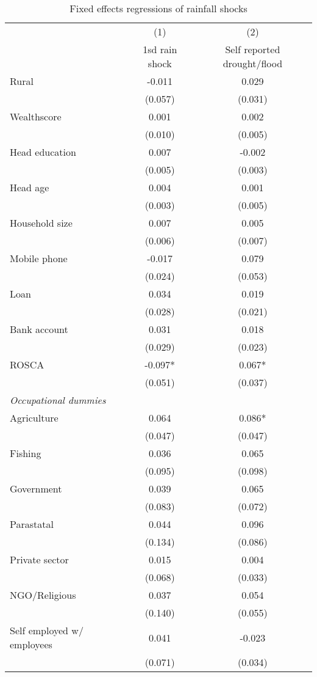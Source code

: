\begin{table}
\centering \caption{Fixed effects regressions of rainfall shocks} \label{shock corr}
\def\arraystretch{0.7}
\begin{tabular}{lcc} \hline
 & (1) & (2) \\
 & 1sd rain shock & Self reported drought/flood \\ \hline
Rural & -0.011 & 0.029 \\
 & (0.057) & (0.031) \\
Wealthscore & 0.001 & 0.002 \\
 & (0.010) & (0.005) \\
Head education & 0.007 & -0.002 \\
 & (0.005) & (0.003) \\
Head age & 0.004 & 0.001 \\
 & (0.003) & (0.005) \\
Household size & 0.007 & 0.005 \\
 & (0.006) & (0.007) \\
Mobile phone & -0.017 & 0.079 \\
 & (0.024) & (0.053) \\
Loan  & 0.034 & 0.019 \\
 & (0.028) & (0.021) \\
Bank account & 0.031 & 0.018 \\
 & (0.029) & (0.023) \\
ROSCA  & -0.097* & 0.067* \\
 & (0.051) & (0.037) \\
\textit{Occupational dummies} & & \\
Agriculture & 0.064 & 0.086* \\
 & (0.047) & (0.047) \\
Fishing & 0.036 & 0.065 \\
 & (0.095) & (0.098) \\
Government & 0.039 & 0.065 \\
 & (0.083) & (0.072) \\
Parastatal & 0.044 & 0.096 \\
 & (0.134) & (0.086) \\
Private sector & 0.015 & 0.004 \\
 & (0.068) & (0.033) \\
NGO/Religious & 0.037 & 0.054 \\
 & (0.140) & (0.055) \\
Self employed w/ employees & 0.041 & -0.023 \\
 & (0.071) & (0.034) \\

\end{tabular}
\end{table}
